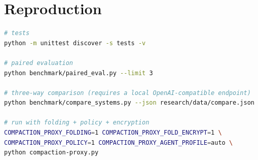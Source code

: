 \documentclass[11pt,a4paper]{article}
\begin{document}
\section{Reproduction}
\begin{lstlisting}[language=bash]
# tests
python -m unittest discover -s tests -v

# paired evaluation
python benchmark/paired_eval.py --limit 3

# three-way comparison (requires a local OpenAI-compatible endpoint)
python benchmark/compare_systems.py --json research/data/compare.json

# run with folding + policy + encryption
COMPACTION_PROXY_FOLDING=1 COMPACTION_PROXY_FOLD_ENCRYPT=1 \
COMPACTION_PROXY_POLICY=1 COMPACTION_PROXY_AGENT_PROFILE=auto \
python compaction-proxy.py
\end{lstlisting}
\end{document}
